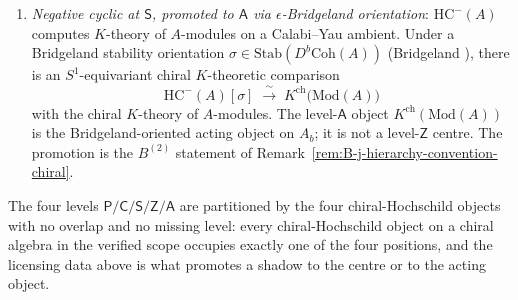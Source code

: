 \begin{theorem}
\begin{enumerate}[label=\textup{(\roman*)}]
(Virasoro at $c \ne 25, 26$, principal $\cW_N$, etc.):
the SS does not converge.
\item \emph{Negative cyclic at $\mathsf{S}$, promoted to $\mathsf{A}$
via $\epsilon$-Bridgeland orientation}: $\mathrm{HC}^{-}(A)$
computes $K$-theory of $A$-modules on a Calabi--Yau ambient.
Under a Bridgeland stability orientation $\sigma \in
\mathrm{Stab}(D^b\mathrm{Coh}(A))$
(Bridgeland \cite{BM01,Bridgeland07}), there is an $S^1$-equivariant
chiral $K$-theoretic comparison
\[
\mathrm{HC}^{-}(A)[\sigma]
 \;\xrightarrow{\;\sim\;}\;
 K^{\mathrm{ch}}\bigl(\mathrm{Mod}(A)\bigr)
\]
with the chiral $K$-theory of $A$-modules. The level-$\mathsf{A}$
object $K^{\mathrm{ch}}(\mathrm{Mod}(A))$ is the Bridgeland-oriented
acting object on $A_b$; it is not a level-$\mathsf{Z}$ centre.
The promotion is the $B^{(2)}$ statement of
Remark~\ref{rem:B-j-hierarchy-convention-chiral}.
\end{enumerate}
The four levels $\mathsf{P}/\mathsf{C}/\mathsf{S}/\mathsf{Z}/\mathsf{A}$
are partitioned by the four chiral-Hochschild objects with no
overlap and no missing level: every chiral-Hochschild object on a
chiral algebra in the verified scope occupies exactly one of the
four positions, and the licensing data above is what promotes a
shadow to the centre or to the acting object.
\end{theorem}

